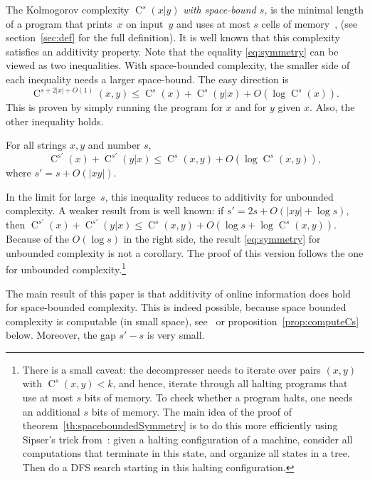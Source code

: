 \documentclass[runningheads]{llncs}
\DeclareMathOperator{\C}{C} \newcommand{\Cev}{\C_\textnormal{ev}} \newcommand{\Codd}{\C_\textnormal{odd}}
\begin{document}
The Kolmogorov complexity $\C^s(x|y)$ {\em with space-bound $s$,} 
is the minimal length of a program that prints~$x$ on input~$y$ and uses at most $s$ cells of memory~\cite{Bauwens2022Inequalities,Hartmanis1983generalizedKolm}, (see section~\ref{sec:def} for the full definition). 
It is well known that this complexity satisfies an additivity property. 
Note that the equality \eqref{eq:symmetry} can be viewed as two inequalities. 
With space-bounded complexity, the smaller side of each inequality needs a larger space-bound. 
The easy direction is
\[
  \C^{s+2|x|+O(1)}(x,y) \le \C^s(x) + \C^s(y|x) + O(\log \C^s(x)). 
\]
This is proven by simply running the program for $x$ and for $y$ given $x$. 
Also, the other inequality holds. 

\begin{theorem}\label{th:spaceboundedSymmetry}
  For all strings $x,y$ and number $s$, 
  \[
    \C^{s'}(x) + \C^{s'}(y|x) \le \C^s(x,y) + O(\log \C^s(x,y)), 
  \]
  where $s' = s + O(|xy|)$.  
\end{theorem}

In the limit for large~$s$, this inequality reduces to additivity for unbounded complexity. 
A weaker result from \cite{Longpre1986PhD,Longpre1993symmetry} is well known: if $s' = 2s + O(|xy|+\log s)$, then $\C^{s'}(x) + \C^{s'}(y|x) \le \C^s(x,y) + O(\log s + \log \C^s(x,y))$. 
Because of the $O(\log s)$ in the right side, the result \eqref{eq:symmetry} for unbounded complexity is not a corollary. 
The proof of this version follows the one for unbounded complexity.\footnote{
  There is a small caveat: the decompresser needs to iterate over pairs $(x,y)$ with $\C^s(x,y) < k$, and hence, iterate through all halting programs that use at most $s$ bits of memory. 
  To check whether a program halts, one needs an additional $s$ bits of memory. 
  The main idea of the proof of  theorem~\ref{th:spaceboundedSymmetry} is to do this more efficiently using Sipser's trick from~\cite{Sipser1980halting}: 
  given a halting configuration of a machine, consider all computations that terminate in this state, and organize all states in a tree. 
  Then do a DFS search starting in this halting configuration. 
} 

The main result of this paper is that additivity of online information does hold for space-bounded complexity. 
This is indeed possible, because space bounded complexity is computable (in small space), see~\cite[lemma 3]{Bauwens2022Inequalities} or proposition~\ref{prop:computeCs} below.  
Moreover, the gap $s'-s$ is very small. 
\end{document}
